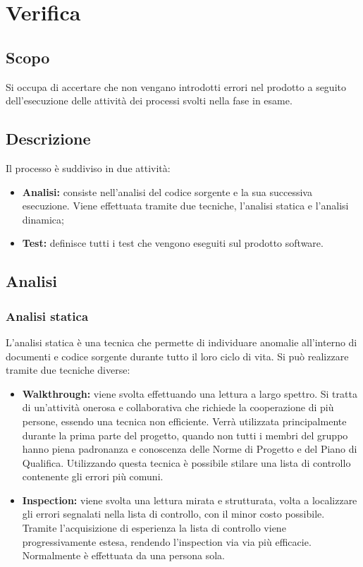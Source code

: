 \documentclass[../NormeDiProgetto.tex]{subfiles}
\begin{document}
	
\section{Verifica}
\subsection{Scopo}
Si occupa di accertare che non vengano introdotti errori nel prodotto a seguito dell’esecuzione delle attività dei processi svolti nella fase in esame.
\subsection{Descrizione}
Il processo è suddiviso in due attività:
\begin{itemize}
\item \textbf{Analisi:} consiste nell’analisi del codice sorgente e la sua successiva esecuzione.
Viene effettuata tramite due tecniche, l’analisi statica e l’analisi dinamica;
\item \textbf{Test:} definisce tutti i test che vengono eseguiti sul prodotto software.
\end{itemize}
\subsection{Analisi}
\subsubsection{Analisi statica}
L’analisi statica è una tecnica che permette di individuare anomalie all’interno di documenti
e codice sorgente durante tutto il loro ciclo di vita. Si può realizzare tramite due
tecniche diverse:
\begin{itemize}
\item \textbf{Walkthrough:} viene svolta effettuando una lettura a largo spettro. Si tratta
di un’attività onerosa e collaborativa che richiede la cooperazione di più persone,
essendo una tecnica non efficiente. Verrà utilizzata principalmente durante la prima
parte del progetto, quando non tutti i membri del gruppo hanno piena padronanza
e conoscenza delle Norme di Progetto e del Piano di Qualifica. Utilizzando questa
tecnica è possibile stilare una lista di controllo contenente gli errori più comuni.
\item \textbf{Inspection:} viene svolta una lettura mirata e strutturata, volta a localizzare gli
errori segnalati nella lista di controllo, con il minor costo possibile. Tramite l’acquisizione
di esperienza la lista di controllo viene progressivamente estesa, rendendo
l’inspection via via più efficacie. Normalmente è effettuata da una persona sola.
\end{itemize}
\end{document}
